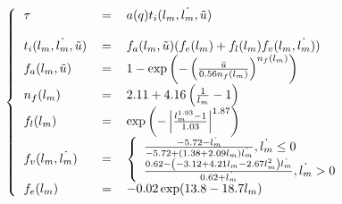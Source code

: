 \documentclass[pdftex,a4paper,11pt]{article}
\numberwithin{equation}{subsection}
\begin{document}
\[
\left\{
\begin{tabular}{lcl}
    $\tau$ & = & $a(q) t_i(l_m, \dot{l_m}, \tilde{u})$ \\
    \\
    $t_i(l_m, \dot{l_m}, \tilde{u})$ & = & $f_a(l_m, \tilde{u})(f_e(l_m) + f_l(l_m) f_v(l_m, \dot{l_m}))$ \\
    $f_a(l_m, \tilde{u})$          & = & $1 - \exp \left(- \left(\frac{\tilde{u}}{0.56 n_f(l_m)}\right)^{n_f(l_m)}\right)$ \\
    $n_f(l_m)$                     & = & $2.11 + 4.16 \left(\frac{1}{l_m} - 1\right)$ \\
    $f_l(l_m)$                     & = & $\exp \left(-\left|\frac{l_m^{1.93} - 1}{1.03}\right|^{1.87}\right)$ \\
    $f_v(l_m, \dot{l_m})$          & = & 
        $\left\{ 
        \begin{array}{l}
            \frac{-5.72 - \dot{l_m}}{-5.72 + (1.38 + 2.09 l_m) \dot{l_m}}, \dot{l_m} \leq 0 \\
            \frac{0.62 - \left(-3.12 + 4.21 l_m - 2.67 l_m^2\right) \dot{l_m}}{0.62 + \dot{l_m}}, \dot{l_m} > 0 \\
        \end{array}
        \right.$ \\
    $f_e(l_m)$                     & = & $-0.02 \exp(13.8 - 18.7 l_m)$ \\
\end{tabular}
\right.
\]
\end{document}
